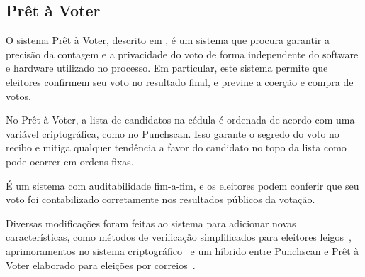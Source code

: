 \subsection{Prêt à Voter}

O sistema Prêt à Voter, descrito em \textcite{ryan2009pret}, é um sistema que procura garantir a precisão da contagem e a privacidade do voto de forma independente do software e hardware utilizado no processo. Em particular, este sistema permite que eleitores confirmem seu voto no resultado final, e previne a coerção e compra de votos.

No Prêt à Voter, a lista de candidatos na cédula é ordenada de acordo com uma variável criptográfica, como no Punchscan. Isso garante o segredo do voto no recibo e mitiga qualquer tendência a favor do candidato no topo da lista como pode ocorrer em ordens fixas.

É um sistema com auditabilidade fim-a-fim, e os eleitores podem conferir que seu voto foi contabilizado corretamente nos resultados públicos da votação.

Diversas modificações foram feitas ao sistema para adicionar novas características, como métodos de verificação simplificados para eleitores leigos~\cite{lundin2008human}, aprimoramentos no sistema criptográfico~\cite{ryan2006pret} e um híbrido entre Punchscan e Prêt à Voter elaborado para eleições por correios~\cite{popoveniuc2007simple}.